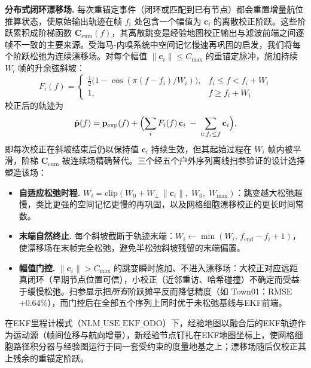 \textbf{分布式闭环漂移场.} 每次重锚定事件（闭环或匹配到已有节点）都会重置增量航位推算状态，使原始输出轨迹在帧 $f_i$ 处包含一个幅值为 $\mathbf{c}_i$ 的离散校正阶跃。这些阶跃累积成阶梯函数 $\mathbf{C}_{\mathrm{cum}}(f)$，其离散跳变是经验地图校正输出与滤波前端之间逐帧不一致的主要来源。受海马-内嗅系统中空间记忆慢速再巩固的启发，我们将每个阶跃松弛为连续漂移场。对每个幅值 $\lVert\mathbf{c}_i\rVert \le C_{\max}$ 的重锚定脉冲，施加持续 $W_i$ 帧的升余弦斜坡：
\begin{equation}
    F_i(f) =
    \begin{cases}
        \tfrac{1}{2}\bigl(1-\cos(\pi (f-f_i)/W_i)\bigr), & f_i \le f < f_i + W_i \\
        1, & f \ge f_i + W_i
    \end{cases}
\end{equation}
校正后的轨迹为
\begin{equation}
    \hat{\mathbf{p}}(f) = \mathbf{p}_{\mathrm{exp}}(f) + \Bigl(\sum_i F_i(f)\,\mathbf{c}_i \;-\; \sum_{i:\,f_i \le f}\mathbf{c}_i\Bigr),
\end{equation}
即每次校正在斜坡结束后仍以保持值 $\mathbf{c}_i$ 持续生效，但其起始过程在 $W_i$ 帧内被平滑，阶梯 $\mathbf{C}_{\mathrm{cum}}$ 被连续场精确替代。三个经五个户外序列离线扫参验证的设计选择塑造该场：
\begin{itemize}
    \item \textbf{自适应松弛时程.} $W_i = \mathrm{clip}(W_0 + W_{\perp}\,\lVert\mathbf{c}_i\rVert,\; W_0,\; W_{\max})$：跳变越大松弛越慢，类比更强的空间记忆更慢的再巩固，以及网格细胞漂移校正的更长时间常数。
    \item \textbf{末端自然终止.} 每个斜坡截断于轨迹末端：$W_i \leftarrow \min(W_i,\, f_{\mathrm{end}}{-}f_i{+}1)$，使漂移场在末帧完全松弛，避免半松弛斜坡残留的末端偏置。
    \item \textbf{幅值门控.} $\lVert\mathbf{c}_i\rVert > C_{\max}$ 的跳变瞬时施加、不进入漂移场：大校正对应远距真闭环（早期节点位置可信），小校正（近邻重访、哈希碰撞）不确定而受益于缓慢松弛。扫参显示把\emph{所有}阶跃摊平反而降低精度（如 Town01：RMSE +0.64\%），而门控后在全部五个序列上同时优于未松弛基线与EKF前端。
\end{itemize}
在EKF里程计模式（$\mathrm{NLM\_USE\_EKF\_ODO}$）下，经验地图以融合后的EKF轨迹作为运动源（帧间位移与航向增量），新经验节点钉扎在EKF地图坐标上，使网格细胞路径积分器与经验图运行于同一套受约束的度量地基之上；漂移场随后仅校正其上残余的重锚定阶跃。

